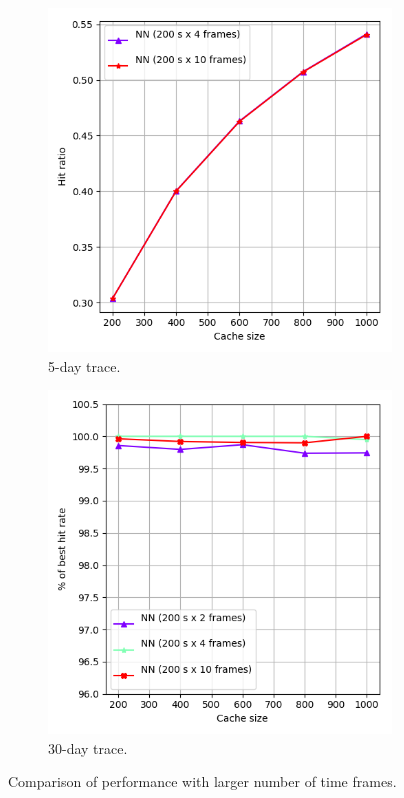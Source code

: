 \begin{figure}[t!]
	\centering
	
	\begin{subfigure}[b]{0.49\linewidth}
		\includegraphics[width=\linewidth]{pics/cache5.png}
		\caption{5-day trace.}
	\end{subfigure}
	\begin{subfigure}[b]{0.49\linewidth}
		\includegraphics[width=\linewidth]{pics/cache5_2.png}
		\caption{30-day trace.}
	\end{subfigure}
	\caption{Comparison of performance with larger number of time frames.}
	\label{fig:cache5}
\end{figure}

